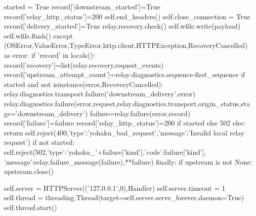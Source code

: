                     started = True
                    record['downstream_started']=True
                    record['relay_http_status']=200
                    self.end_headers()
                    self.close_connection = True
                    record['delivery_started']=True
                    relay.recovery.check()
                    self.wfile.write(payload)
                    self.wfile.flush()
                except (OSError,ValueError,TypeError,http.client.HTTPException,RecoveryCancelled) as error:
                    if 'record' in locals():
                        record['recovery']=list(relay.recovery.request_events)
                        record['upstream_attempt_count']=relay.diagnostics.sequence-first_sequence
                        if started and not isinstance(error,RecoveryCancelled):
                            relay.diagnostics.transport.failure('downstream_delivery',error)
                            relay.diagnostics.failure(error,request,relay.diagnostics.transport.origin_status,stage='downstream_delivery')
                        failure=relay.failure(error,record)
                        record['failure']=failure
                        record['relay_http_status']=200 if started else 502
                    else:
                        return self.reject(400,{'type':'yohaku_bad_request','message':'Invalid local relay request'})
                    if not started:
                        self.reject(502,{'type':'yohaku_'+failure['kind'],'code':failure['kind'],
                            'message':relay.failure_message(failure),**failure})
                finally:
                    if upstream is not None:
                        upstream.close()

        self.server = HTTPServer(('127.0.0.1',0),Handler)
        self.server.timeout = 1
        self.thread = threading.Thread(target=self.server.serve_forever,daemon=True)
        self.thread.start()

